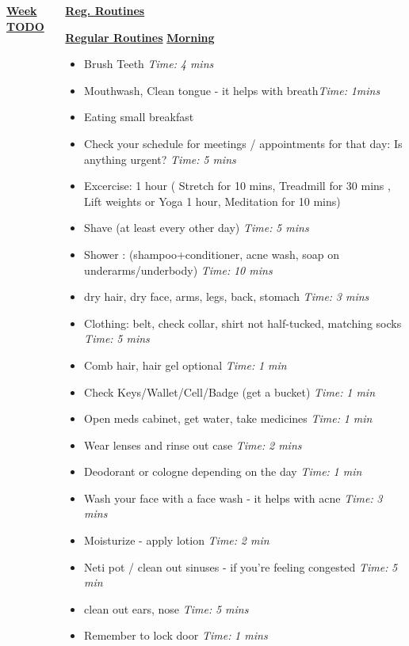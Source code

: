 \documentclass[serif,mathserif,final]{beamer}
\newcommand{\timeEst}[1]{\textit{Time:} \textit{#1}}
\begin{document}
\begin{frame}{}
\begin{columns}[t]
\begin{column}{0.33\linewidth}{\textbf{\underline{Week TODO}}}
\begin{block}
\end{block} 

\end{column}%

\begin{column}{0.27\linewidth} {\textbf{\underline{Reg. Routines}}} 

\begin{block}{\small \textbf{\underline{Regular Routines}} }
\underline{\textbf{Morning}}
\begin{itemize}
\item \tiny Brush Teeth \timeEst{4 mins}
\item \tiny Mouthwash, Clean tongue - it helps with breath\timeEst{1mins} 
\item \tiny Eating small breakfast
\item \tiny Check your schedule for meetings / appointments for that day: Is anything urgent? \timeEst{5 mins}
\item \tiny Excercise: 1 hour ( Stretch for 10 mins, Treadmill for 30 mins , Lift weights or Yoga 1 hour, Meditation for 10 mins)
\item \tiny Shave (at least every other day) \timeEst{5 mins}
\item \tiny Shower : (shampoo+conditioner, acne wash,  soap on underarms/underbody)
\timeEst{10 mins}
\item \tiny dry hair, dry face, arms, legs, back, stomach \timeEst{3 mins}
\item \tiny Clothing: belt, check collar, shirt not half-tucked, matching socks \timeEst{5 mins}
\item \tiny Comb hair, hair gel optional \timeEst{ 1 min}
\item \tiny Check Keys/Wallet/Cell/Badge (get a bucket) \timeEst{1 min}
\item \tiny Open meds cabinet, get water, take medicines \timeEst{1 min}
\item \tiny Wear lenses and rinse out case \timeEst{ 2 mins}
\item \tiny Deodorant or cologne depending on the day \timeEst{1 min}
\item \tiny Wash your face with a face wash - it helps with acne \timeEst{3 mins}
\item \tiny Moisturize - apply lotion \timeEst{ 2 min}
\item \tiny Neti pot / clean out sinuses - if you’re feeling congested \timeEst{5 min}
\item \tiny clean out ears, nose \timeEst{5 mins}
\item \tiny Remember to lock door \timeEst{1 mins}
\end{itemize}


\end{block}
\end{column}
\end{columns}
\end{frame}
\end{document}
